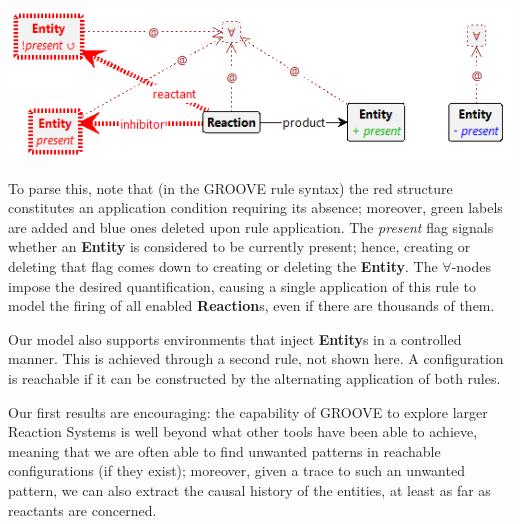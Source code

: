 \documentclass{llncs}
\newcommand{\lab}[1]{\textsf{#1}}
\newcommand{\blab}[1]{\lab{\bfseries #1}}
\newcommand{\ilab}[1]{\lab{\itshape #1}}
\begin{document}
\begin{center}
\includegraphics[scale=.6]{react}
\end{center}

To parse this, note that (in the GROOVE rule syntax) the red structure constitutes an application condition requiring its absence; moreover, green labels are added and blue ones deleted upon rule application. The \ilab{present} flag signals whether an \blab{Entity} is considered to be currently present; hence, creating or deleting that flag comes down to creating or deleting the \blab{Entity}. The $\forall$-nodes impose the desired quantification, causing a single application of this rule to model the firing of all enabled \blab{Reaction}s, even if there are thousands of them.

Our model also supports environments that inject \blab{Entity}s in a controlled manner. This is achieved through a second rule, not shown here. A configuration is reachable if it can be constructed by the alternating application of both rules.

\medskip\noindent
Our first results are encouraging: the capability of GROOVE to explore larger Reaction Systems is well beyond what other tools have been able to achieve, meaning that we are often able to find unwanted patterns in reachable configurations (if they exist); moreover, given a trace to such an unwanted pattern, we can also extract the causal history of the entities, at least as far as reactants are concerned.
\end{document}
